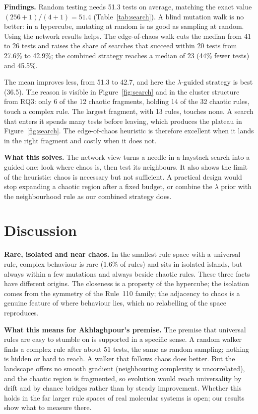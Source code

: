 \documentclass[10pt,letterpaper,twocolumn]{article}
\newcommand{\para}[1]{\textbf{#1}\hspace{0.4em}}
\begin{document}
\para{Findings.} Random testing needs 51.3 tests on average, matching the exact value $(256+1)/(4+1) = 51.4$ (Table~\ref{tab:search}). A blind mutation walk is no better: in a hypercube, mutating at random is as good as sampling at random. Using the network results helps. The edge-of-chaos walk cuts the median from 41 to 26 tests and raises the share of searches that succeed within 20 tests from 27.6\% to 42.9\%; the combined strategy reaches a median of 23 (44\% fewer tests) and 45.5\%.

The mean improves less, from 51.3 to 42.7, and here the $\lambda$-guided strategy is best (36.5). The reason is visible in Figure~\ref{fig:search} and in the cluster structure from RQ3: only 6 of the 12 chaotic fragments, holding 14 of the 32 chaotic rules, touch a complex rule. The largest fragment, with 13 rules, touches none. A search that enters it spends many tests before leaving, which produces the plateau in Figure~\ref{fig:search}. The edge-of-chaos heuristic is therefore excellent when it lands in the right fragment and costly when it does not.

\para{What this solves.} The network view turns a needle-in-a-haystack search into a guided one: look where chaos is, then test its neighbours. It also shows the limit of the heuristic: chaos is necessary but not sufficient. A practical design would stop expanding a chaotic region after a fixed budget, or combine the $\lambda$ prior with the neighbourhood rule as our combined strategy does.

\section{Discussion}

\para{Rare, isolated and near chaos.} In the smallest rule space with a universal rule, complex behaviour is rare (1.6\% of rules) and sits in isolated islands, but always within a few mutations and always beside chaotic rules. These three facts have different origins. The closeness is a property of the hypercube; the isolation comes from the symmetry of the Rule~110 family; the adjacency to chaos is a genuine feature of where behaviour lies, which no relabelling of the space reproduces.

\para{What this means for Akhlaghpour's premise.} The premise that universal rules are easy to stumble on is supported in a specific sense. A random walker finds a complex rule after about 51 tests, the same as random sampling; nothing is hidden or hard to reach. A walker that follows chaos does better. But the landscape offers no smooth gradient (neighbouring complexity is uncorrelated), and the chaotic region is fragmented, so evolution would reach universality by drift and by chance bridges rather than by steady improvement. Whether this holds in the far larger rule spaces of real molecular systems is open; our results show what to measure there.
\end{document}
